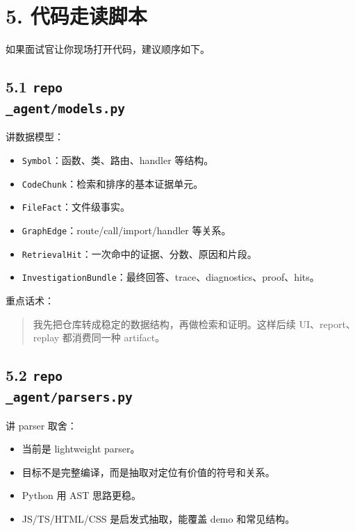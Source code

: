\documentclass[UTF8,12pt,openany]{ctexbook}
\begin{document}
\section{5. 代码走读脚本}

如果面试官让你现场打开代码，建议顺序如下。\par

\subsection{5.1 \texttt{repo\\_agent/models.py}}

讲数据模型：\par

\begin{itemize}
\item \texttt{Symbol}：函数、类、路由、handler 等结构。
\item \texttt{CodeChunk}：检索和排序的基本证据单元。
\item \texttt{FileFact}：文件级事实。
\item \texttt{GraphEdge}：route/call/import/handler 等关系。
\item \texttt{RetrievalHit}：一次命中的证据、分数、原因和片段。
\item \texttt{InvestigationBundle}：最终回答、trace、diagnostics、proof、hits。
\end{itemize}

重点话术：\par

\begin{quote}
我先把仓库转成稳定的数据结构，再做检索和证明。这样后续 UI、report、replay 都消费同一种 artifact。
\end{quote}

\subsection{5.2 \texttt{repo\\_agent/parsers.py}}

讲 parser 取舍：\par

\begin{itemize}
\item 当前是 lightweight parser。
\item 目标不是完整编译，而是抽取对定位有价值的符号和关系。
\item Python 用 AST 思路更稳。
\item JS/TS/HTML/CSS 是启发式抽取，能覆盖 demo 和常见结构。
\end{itemize}
\end{document}
